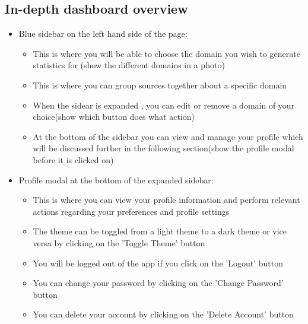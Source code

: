 \documentclass[12pt]{article}
\begin{document}
\subsection{In-depth dashboard overview}
\begin{itemize}
    \item Blue sidebar on the left hand side of the page:
    \begin{itemize}
        \item This is where you will be able to choose the domain you wish to generate statistics for (show the different domains in a photo)
        \item This is where you can group sources together about a specific domain
        \item When the sidear is expanded , you can edit or remove a domain of your choice(show which button does what action)
        \item At the bottom of the sidebar you can view and manage your profile which will be discussed further in the following section(show the profile modal before it is clicked on)
    \end{itemize}
    \item Profile modal at the bottom of the expanded sidebar:
    \begin{itemize}
        \item This is where you can view your profile information and perform relevant actions regarding your preferences and profile settings
        \item The theme can be toggled from a light theme to a dark theme or vice versa by clicking on the 'Toggle Theme' button
        \item You will be logged out of the app if you click on the 'Logout' button
        \item You can change your password by clicking on the 'Change Password' button
        \item You can delete your account by clicking on the 'Delete Account' button
    \end{itemize}
\end{itemize}
\end{document}
